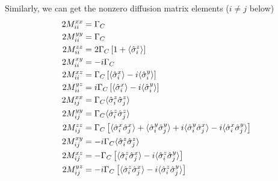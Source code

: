 \documentclass{article}
\newcommand{\gc}{\Gamma_C}
\begin{document}
Similarly, we can get the nonzero diffusion matrix elements ($i \neq j$ below)
\begin{align}
\label{diffusion;xy}
    \notag 2M_{ii}^{xx} &= \gc\\
    \notag 2M_{ii}^{yy} &= \gc\\
    \notag 2M_{ii}^{zz} &= 2\gc\left[1+\langle \hat{\sigma}_i^z\rangle\right]\\
    \notag 2M_{ii}^{xy} &= -i\gc\\
    \notag 2M_{ii}^{xz} &= \gc\left[\langle\hat{\sigma}_i^x\rangle-i\langle\hat{\sigma}_i^y\rangle\right]\\
    \notag 2M_{ii}^{yz} &= i\gc\left[\langle\hat{\sigma}_i^x\rangle-i\langle\hat{\sigma}_i^y\rangle\right]\\
    2M_{ij}^{xx} &= \gc\langle \hat{\sigma}_i^z\hat{\sigma}_j^z\rangle\\
    \notag 2M_{ij}^{yy} &= \gc\langle \hat{\sigma}_i^z\hat{\sigma}_j^z\rangle\\
    \notag 2M_{ij}^{zz} &= \gc\left[\langle \hat{\sigma}_i^x\hat{\sigma}_j^x\rangle+\langle \hat{\sigma}_i^y\hat{\sigma}_j^y\rangle+i\langle           \hat{\sigma}_i^y\hat{\sigma}_j^x\rangle-i\langle \hat{\sigma}_i^x\hat{\sigma}_j^y\rangle\right]\\
    \notag 2M_{ij}^{xy} &= -i\gc\langle \hat{\sigma}_i^z\hat{\sigma}_j^z\rangle\\
    \notag 2M_{ij}^{xz} &= -\gc\left[\langle \hat{\sigma}_i^z\hat{\sigma}_j^x\rangle-i\langle \hat{\sigma}_i^z\hat{\sigma}_j^y\rangle\right]\\
    \notag 2M_{ij}^{yz} &= -i\gc\left[\langle \hat{\sigma}_i^z\hat{\sigma}_j^x\rangle-i\langle \hat{\sigma}_i^z\hat{\sigma}_j^y\rangle\right]
\end{align}
\end{document}

